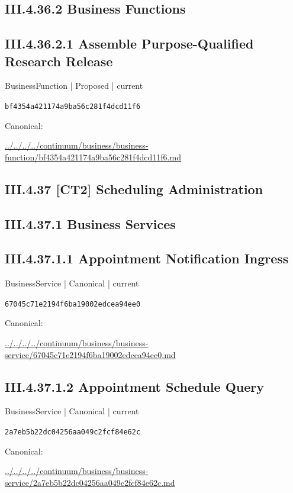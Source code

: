 \documentclass[10pt,a4paper]{article}
\begin{document}
\subsection*{III.4.36.2 Business Functions}
\subsection*{III.4.36.2.1 Assemble Purpose-Qualified Research Release}
{\small BusinessFunction | Proposed | current}\par
\texttt{bf4354a421174a9ba56c281f4dcd11f6}\par
Canonical: \par
{\footnotesize\url{../../../../continuum/business/business-function/bf4354a421174a9ba56c281f4dcd11f6.md}}\par
\subsection*{III.4.37 [CT2] Scheduling Administration}
\subsection*{III.4.37.1 Business Services}
\subsection*{III.4.37.1.1 Appointment Notification Ingress}
{\small BusinessService | Canonical | current}\par
\texttt{67045c71e2194f6ba19002edcea94ee0}\par
Canonical: \par
{\footnotesize\url{../../../../continuum/business/business-service/67045c71e2194f6ba19002edcea94ee0.md}}\par
\subsection*{III.4.37.1.2 Appointment Schedule Query}
{\small BusinessService | Canonical | current}\par
\texttt{2a7eb5b22dc04256aa049c2fcf84e62c}\par
Canonical: \par
{\footnotesize\url{../../../../continuum/business/business-service/2a7eb5b22dc04256aa049c2fcf84e62c.md}}\par
\end{document}
